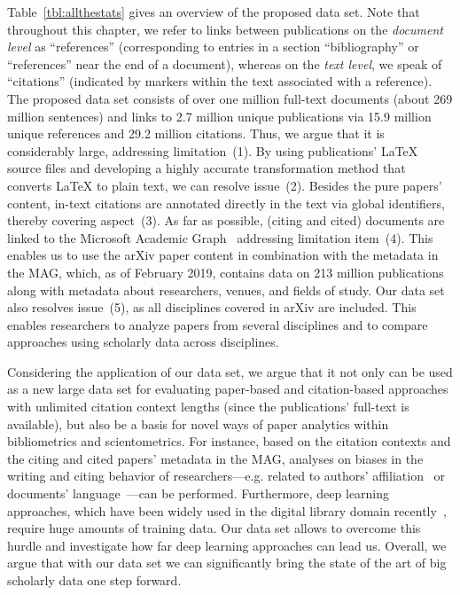 Table~\ref{tbl:allthestats} gives an overview of the proposed data set. Note that throughout this chapter, we refer to links between publications on the \emph{document level} as ``references'' (corresponding to entries in a section ``bibliography'' or ``references'' near the end of a document), whereas on the \emph{text level}, we speak of ``citations'' (indicated by markers within the text associated with a reference). The proposed data set consists of over one million full-text documents (about 269 million sentences) and links to 2.7 million unique publications via 15.9 million unique references and 29.2 million citations.
Thus, we argue that it is considerably large, addressing limitation~(1). By using publications' \LaTeX{} source files and developing a highly accurate transformation method that converts \LaTeX{} to plain text, we can resolve issue~(2). Besides the pure papers' content, in-text citations are annotated directly in the text via global identifiers, thereby covering aspect~(3). As far as possible, (citing and cited) documents are linked to the Microsoft Academic Graph~\cite{Sinha2015} addressing limitation item~(4). This enables us to use the arXiv paper content in combination with the metadata in the MAG, which, as of February 2019, contains data on 213 million publications along with metadata about researchers, venues, and fields of study. Our data set also resolves issue~(5), as all disciplines covered in arXiv are included. This enables researchers to analyze papers from several disciplines and to compare approaches using scholarly data across disciplines.

Considering the application of our data set, we argue that it not only can be used as a new large data set for evaluating paper-based and citation-based approaches with unlimited citation context lengths (since the publications' full-text is available),
but also be a basis for novel ways of paper analytics within bibliometrics and scientometrics. For instance, based on the citation contexts and the citing and cited papers' metadata in the MAG, analyses on biases in the writing and citing behavior of researchers---e.g. related to authors' affiliation~\cite{Reingewertz2018} or documents' language~\cite{Liang2013,Liu2018}---can be performed.
Furthermore, deep learning approaches, which have been widely used in the digital library domain recently~\cite{Ebensu2017}, require huge amounts of training data. Our data set allows to overcome this hurdle and investigate how far deep learning approaches can lead us.
Overall, we argue that with our data set we can significantly bring the state of the art of big scholarly data one step forward.

